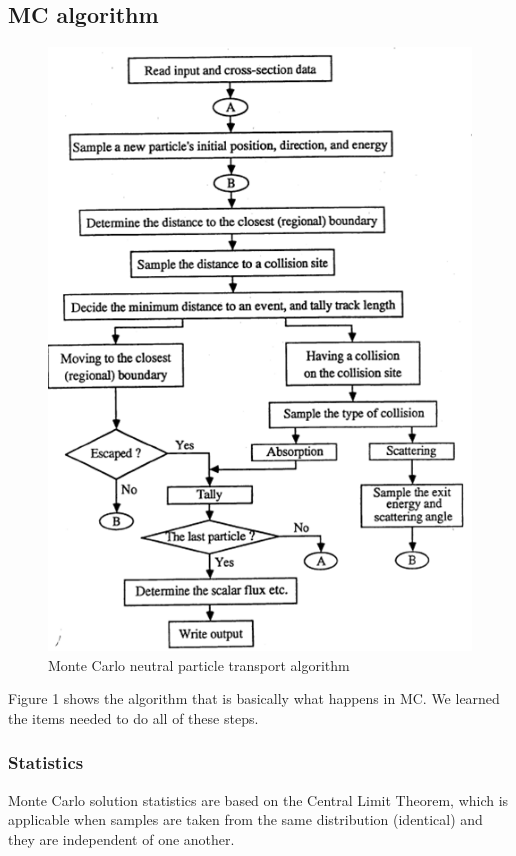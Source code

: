 \documentclass[12pt]{article}
\begin{document}
\subsection*{MC algorithm}
\begin{figure}[h]
\begin{center}
  \includegraphics[height=6 in,clip]{figs/MC-algorithm}
  \caption{Monte Carlo neutral particle transport algorithm}
  \end{center}
  \label{fig:mc-algo}
\end{figure}

Figure 1 shows the algorithm that is basically what happens in MC. We learned the items needed to do all of these steps.

\subsubsection*{Statistics}

Monte Carlo solution statistics are based on the Central Limit Theorem, which is applicable when samples are taken from the same distribution (identical) and they are independent of one another. 
\end{document}
